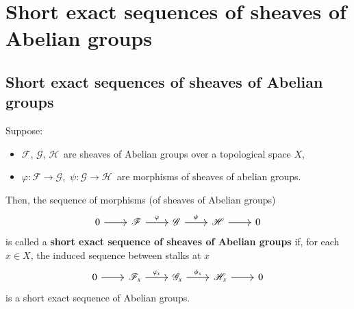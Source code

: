 

\section{Short exact sequences of sheaves of Abelian groups}


\renewcommand{\theenumi}{\roman{enumi}}
\renewcommand{\labelenumi}{\textnormal{(\theenumi)}$\;\;$}


\subsection{Short exact sequences of sheaves of Abelian groups}
\setcounter{theorem}{0}
\setcounter{equation}{0}

\begin{definition}
\mbox{}\vskip 0.1cm
\noindent
Suppose:
\begin{itemize}
\item
	$\mathscr{F}$, $\mathscr{G}$, $\mathscr{H}$\, are sheaves of Abelian groups over a topological space $X$,
\item
	$\varphi : \mathscr{F}\longrightarrow\mathscr{G}$,\,
	$\psi : \mathscr{G}\longrightarrow\mathscr{H}$\,
	are morphisms of sheaves of abelian groups.
\end{itemize}
Then, the sequence of morphisms (of sheaves of Abelian groups)
\begin{equation*}
\begin{tikzcd}
0                 \arrow[r] &
\mathscr{F} \arrow[r, "\varphi"] &
\mathscr{G} \arrow[r, "\psi"] &
\mathscr{H} \arrow[r] &
0
\end{tikzcd}
\end{equation*}
is called a \textbf{short exact sequence of sheaves of Abelian groups}
if, for each $x \in X$, the induced sequence between stalks at $x$
\begin{equation*}
\begin{tikzcd}
0                 \arrow[r] &
\mathscr{F}_{x} \arrow[r, "\varphi_{x}"] &
\mathscr{G}_{x} \arrow[r, "\psi_{x}"] &
\mathscr{H}_{x} \arrow[r] &
0
\end{tikzcd}
\end{equation*}
is a short exact sequence of Abelian groups.
\end{definition}

